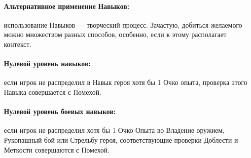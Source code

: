 \paragraph{Альтернативное применение Навыков:} использование Навыков — творческий процесс. Зачастую, добиться желаемого можно множеством разных способов, особенно, если к этому располагает контекст.
\paragraph{Нулевой уровень навыков:} если игрок не распределил в Навык героя хотя бы 1 Очко опыта, проверка этого Навыка совершается с Помехой.
\paragraph{Нулевой уровень боевых навыков:} если игрок не распределил хотя бы 1 Очко Опыта во Владение оружием, Рукопашный бой или Стрельбу героя, соответствующие проверки Доблести и Меткости совершаются с Помехой.

%
%
